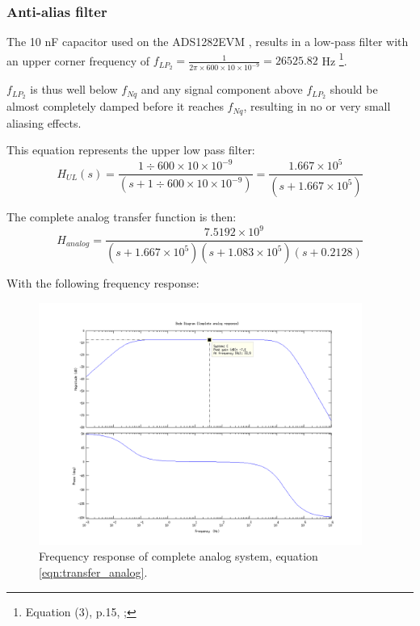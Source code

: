 \documentclass[a4paper]{article}
\begin{document}
\subsubsection{Anti-alias filter}
The 10 nF capacitor used on the ADS1282EVM
\cite{ads1282evm_ds}, results in a low-pass filter with an upper corner frequency of $f_{LP_2} =
\frac{1}{2 \pi \times 600 \times 10 \times 10^{-9}} = 26525.82 $ Hz
\footnote{Equation (3), p.15, \cite{ads1282_ds}; }.

$f_{LP_2}$ is thus well below $f_{Nq}$ and any signal component above $f_{LP_2}$ should
be almost completely damped before it reaches $f_{Nq}$, resulting in no
or very small aliasing effects.

This equation represents the upper low pass filter:
\begin{equation}
  H_{UL}(s) = \frac{1 \div 600 \times 10 \times 10^{-9}}
                   {(s + 1 \div 600 \times 10 \times 10^{-9})}
            = \frac{1.667 \times 10^5}{(s + 1.667 \times 10^5)}
  \label{eqn:transfer_upper_lowpass}
\end{equation}

The complete analog transfer function is then:
\begin{equation}
  H_{analog} = \frac{7.5192 \times 10^9}
                { (s + 1.667 \times 10^5)
                  (s + 1.083 \times 10^5)
                  (s + 0.2128) }
  \label{eqn:transfer_analog}
\end{equation}

With the following frequency response:
\begin{figure}[h!]
  \begin{center}
    \includegraphics[width=400px]{bode_complete_analog.png}
  \end{center}
  \caption{Frequency response of complete analog system, equation
    \eqref{eqn:transfer_analog}.}
  \label{fig:bode_complete_analog}
\end{figure}
\end{document}
